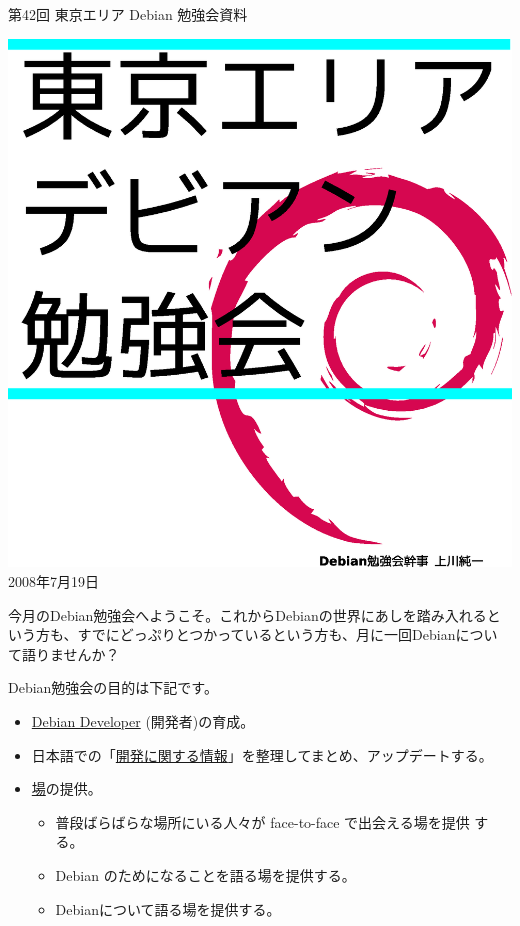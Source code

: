 \documentclass[mingoth,a4paper]{jsarticle}
\newcommand{\debmtgyear}{2008}
\newcommand{\debmtgmonth}{7}
\newcommand{\debmtgdate}{19}
\newcommand{\debmtgnumber}{42}
\begin{document}
\begin{titlepage}
\thispagestyle{empty}


\vspace*{-2cm}
第\debmtgnumber{}回 東京エリア Debian 勉強会資料

\hspace*{-2.4cm}
\includegraphics[width=210mm]{image200801/2008title.eps}\\
\hfill{}\debmtgyear{}年\debmtgmonth{}月\debmtgdate{}日

\end{titlepage}

 
 今月のDebian勉強会へようこそ。これからDebianの世界にあしを踏み入れると
 いう方も、すでにどっぷりとつかっているという方も、月に一回Debianについ
 て語りませんか？

 Debian勉強会の目的は下記です。

\begin{itemize}
 \item \underline{Debian Developer} (開発者)の育成。
 \item 日本語での「\underline{開発に関する情報}」を整理してまとめ、アップデートする。
 \item \underline{場}の提供。
 \begin{itemize}
  \item 普段ばらばらな場所にいる人々が face-to-face で出会える場を提供
	する。
  \item Debian のためになることを語る場を提供する。
  \item Debianについて語る場を提供する。
 \end{itemize}
\end{itemize}		
\end{document}
